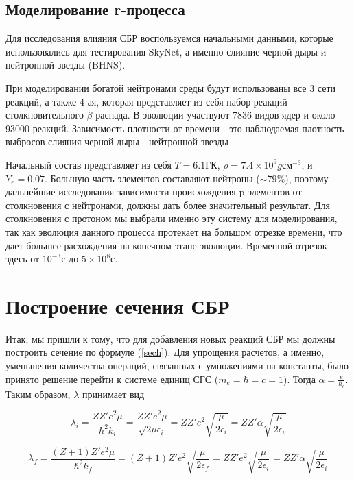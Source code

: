 \documentclass[14pt, a4paper]{article}
\numberwithin{figure}{section}
\numberwithin{equation}{section}
\begin{document}
\subsection{Моделирование r-процесса}

Для исследования влияния СБР воспользуемся начальными данными, которые использовались для тестирования SkyNet, а именно слияние черной дыры и нейтронной звезды (BHNS).

При моделировании богатой нейтронами среды будут использованы все 3 сети реакций, а также 4-ая, которая представляет из себя набор реакций столкновительного $\beta$-распада. В эволюции участвуют 7836 видов ядер и около 93000 реакций. Зависимость плотности от времени - это наблюдаемая плотность выбросов слияния черной дыры - нейтронной звезды \cite{bhns}. 

Начальный состав представляет из себя $T = 6.1 \text{ГК}$, $\rho = 7.4 \times 10^9 g \text{см}^{-3}$, и $Y_e = 0.07$. Большую часть элементов составляют нейтроны ($\sim 79 \%$), поэтому дальнейшие исследования зависимости происхождения p-элементов от столкновения с нейтронами, должны дать более значительный результат. Для столкновения с протоном мы выбрали именно эту систему для моделирования, так как эволюция данного процесса протекает на большом отрезке времени, что дает большее расхождения на конечном этапе эволюции. Временной отрезок здесь от $10^{-3}\text{с}$ до $5\times10^8\text{с}$.

\section{Построение сечения СБР}

Итак, мы пришли к тому, что для добавления новых реакций СБР мы должны построить сечение по формуле (\ref{sech}). Для упрощения расчетов, а именно, уменьшения количества операций, связанных с умножениями на константы, было принято решение перейти к системе единиц СГС ($m_e = \hbar = c = 1$). Тогда $\alpha = \frac{e}{\hbar_c}$. Таким образом, $\lambda$ принимает вид

\begin{equation}
\lambda_i = \frac{Z Z' e^2 \mu}{\hbar^2 k_i} = \frac{Z Z' e^2 \mu}{\sqrt{2\mu \epsilon_i}} = Z Z' e^2 \sqrt{\frac{\mu}{2 \epsilon_i}} = Z Z' \alpha \sqrt{\frac{\mu}{2 \epsilon_i}}
\end{equation}

\begin{equation}
\lambda_f = \frac{(Z+1) Z'  e^2 \mu}{\hbar^2 k_f} = (Z + 1)Z' e^2 \sqrt{\frac{\mu}{2 \epsilon_f}} = Z Z' e^2 \sqrt{\frac{\mu}{2 \epsilon_i}} = Z Z' \alpha \sqrt{\frac{\mu}{2 \epsilon_i}}
\end{equation}
\end{document}
